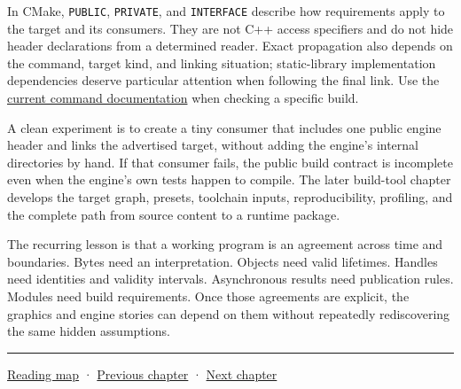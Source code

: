 In CMake, \texttt{PUBLIC}, \texttt{PRIVATE}, and \texttt{INTERFACE} describe how requirements apply to the target and its consumers. They are not C++ access specifiers and do not hide header declarations from a determined reader. Exact propagation also depends on the command, target kind, and linking situation; static-library implementation dependencies deserve particular attention when following the final link. Use the \href{https://cmake.org/cmake/help/latest/command/target_link_libraries.html}{current command documentation} when checking a specific build.

A clean experiment is to create a tiny consumer that includes one public engine header and links the advertised target, without adding the engine's internal directories by hand. If that consumer fails, the public build contract is incomplete even when the engine's own tests happen to compile. The later build-tool chapter develops the target graph, presets, toolchain inputs, reproducibility, profiling, and the complete path from source content to a runtime package.

The recurring lesson is that a working program is an agreement across time and boundaries. Bytes need an interpretation. Objects need valid lifetimes. Handles need identities and validity intervals. Asynchronous results need publication rules. Modules need build requirements. Once those agreements are explicit, the graphics and engine stories can depend on them without repeatedly rediscovering the same hidden assumptions.

\begin{center}\rule{0.5\linewidth}{0.5pt}\end{center}

\hyperref[volume-reading-map]{Reading map} · \hyperref[03-visual-computing-i-ch015-rasterization-foundations-and-renderer-evidence]{Previous chapter} · \hyperref[03-visual-computing-i-ch017-build-test-and-reproduce-the-program]{Next chapter}

